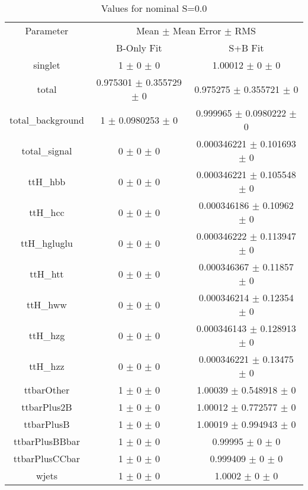 \begin{table}
\centering
\caption{Values for nominal S=0.0}
\begin{tabular}{ccc}
\toprule
Parameter & \multicolumn{2}{c}{Mean $\pm$ Mean Error $\pm$ RMS}\\
 & B-Only Fit & S+B Fit\\
\midrule
singlet & \num{1} $\pm$ \num{0} $\pm$ \num{0} & \num{1.00012} $\pm$ \num{0} $\pm$ \num{0}\\
total & \num{0.975301} $\pm$ \num{0.355729} $\pm$ \num{0} & \num{0.975275} $\pm$ \num{0.355721} $\pm$ \num{0}\\
total\_background & \num{1} $\pm$ \num{0.0980253} $\pm$ \num{0} & \num{0.999965} $\pm$ \num{0.0980222} $\pm$ \num{0}\\
total\_signal & \num{0} $\pm$ \num{0} $\pm$ \num{0} & \num{0.000346221} $\pm$ \num{0.101693} $\pm$ \num{0}\\
ttH\_hbb & \num{0} $\pm$ \num{0} $\pm$ \num{0} & \num{0.000346221} $\pm$ \num{0.105548} $\pm$ \num{0}\\
ttH\_hcc & \num{0} $\pm$ \num{0} $\pm$ \num{0} & \num{0.000346186} $\pm$ \num{0.10962} $\pm$ \num{0}\\
ttH\_hgluglu & \num{0} $\pm$ \num{0} $\pm$ \num{0} & \num{0.000346222} $\pm$ \num{0.113947} $\pm$ \num{0}\\
ttH\_htt & \num{0} $\pm$ \num{0} $\pm$ \num{0} & \num{0.000346367} $\pm$ \num{0.11857} $\pm$ \num{0}\\
ttH\_hww & \num{0} $\pm$ \num{0} $\pm$ \num{0} & \num{0.000346214} $\pm$ \num{0.12354} $\pm$ \num{0}\\
ttH\_hzg & \num{0} $\pm$ \num{0} $\pm$ \num{0} & \num{0.000346143} $\pm$ \num{0.128913} $\pm$ \num{0}\\
ttH\_hzz & \num{0} $\pm$ \num{0} $\pm$ \num{0} & \num{0.000346221} $\pm$ \num{0.13475} $\pm$ \num{0}\\
ttbarOther & \num{1} $\pm$ \num{0} $\pm$ \num{0} & \num{1.00039} $\pm$ \num{0.548918} $\pm$ \num{0}\\
ttbarPlus2B & \num{1} $\pm$ \num{0} $\pm$ \num{0} & \num{1.00012} $\pm$ \num{0.772577} $\pm$ \num{0}\\
ttbarPlusB & \num{1} $\pm$ \num{0} $\pm$ \num{0} & \num{1.00019} $\pm$ \num{0.994943} $\pm$ \num{0}\\
ttbarPlusBBbar & \num{1} $\pm$ \num{0} $\pm$ \num{0} & \num{0.99995} $\pm$ \num{0} $\pm$ \num{0}\\
ttbarPlusCCbar & \num{1} $\pm$ \num{0} $\pm$ \num{0} & \num{0.999409} $\pm$ \num{0} $\pm$ \num{0}\\
wjets & \num{1} $\pm$ \num{0} $\pm$ \num{0} & \num{1.0002} $\pm$ \num{0} $\pm$ \num{0}\\
\bottomrule
\end{tabular}
\end{table}